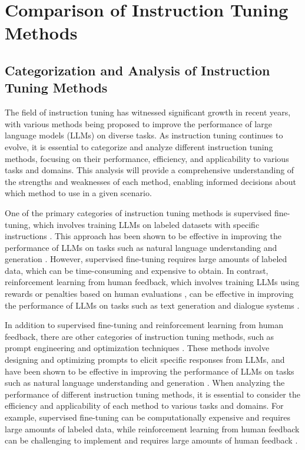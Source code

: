 \documentclass[11pt]{article}
\begin{document}
\section{Comparison of Instruction Tuning Methods}

\subsection{Categorization and Analysis of Instruction Tuning Methods}

The field of instruction tuning has witnessed significant growth in recent years, with various methods being proposed to improve the performance of large language models (LLMs) on diverse tasks. As instruction tuning continues to evolve, it is essential to categorize and analyze different instruction tuning methods, focusing on their performance, efficiency, and applicability to various tasks and domains. This analysis will provide a comprehensive understanding of the strengths and weaknesses of each method, enabling informed decisions about which method to use in a given scenario.

One of the primary categories of instruction tuning methods is supervised fine-tuning, which involves training LLMs on labeled datasets with specific instructions \cite{ref24}. This approach has been shown to be effective in improving the performance of LLMs on tasks such as natural language understanding and generation \cite{ref126}. However, supervised fine-tuning requires large amounts of labeled data, which can be time-consuming and expensive to obtain. In contrast, reinforcement learning from human feedback, which involves training LLMs using rewards or penalties based on human evaluations \cite{ref92}, can be effective in improving the performance of LLMs on tasks such as text generation and dialogue systems \cite{ref127}.

In addition to supervised fine-tuning and reinforcement learning from human feedback, there are other categories of instruction tuning methods, such as prompt engineering and optimization techniques \cite{ref35}. These methods involve designing and optimizing prompts to elicit specific responses from LLMs, and have been shown to be effective in improving the performance of LLMs on tasks such as natural language understanding and generation \cite{ref38}. When analyzing the performance of different instruction tuning methods, it is essential to consider the efficiency and applicability of each method to various tasks and domains. For example, supervised fine-tuning can be computationally expensive and requires large amounts of labeled data, while reinforcement learning from human feedback can be challenging to implement and requires large amounts of human feedback \cite{ref128}.
\end{document}

